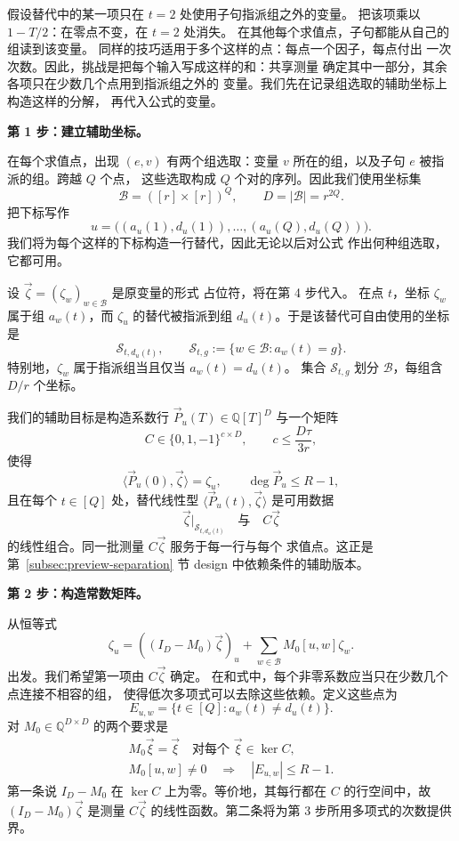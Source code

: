 \documentclass[11pt,reqno]{amsart}
\numberwithin{equation}{section}
\theoremstyle{definition}\newtheorem{definition}[theorem]{定义}
\theoremstyle{remark}\newtheorem{remark}[theorem]{注}
\renewcommand{\le}{\leqslant}
\begin{document}
假设替代中的某一项只在 $t=2$ 处使用子句指派组之外的变量。
把该项乘以 $1-T/2$：在零点不变，在 $t=2$ 处消失。
在其他每个求值点，子句都能从自己的组读到该变量。
同样的技巧适用于多个这样的点：每点一个因子，每点付出
一次次数。因此，挑战是把每个输入写成这样的和：共享测量
确定其中一部分，其余各项只在少数几个点用到指派组之外的
变量。我们先在记录组选取的辅助坐标上构造这样的分解，
再代入公式的变量。

\medskip\noindent
\textbf{第 1 步：建立辅助坐标。}\par\nobreak
\smallskip\noindent
在每个求值点，出现 $(e,v)$ 有两个组选取：变量 $v$
所在的组，以及子句 $e$ 被指派的组。跨越 $Q$ 个点，
这些选取构成 $Q$ 个对的序列。因此我们使用坐标集
\[
 \mathcal B=([r]\times[r])^Q,\qquad D=|\mathcal B|=r^{2Q}.
\]
把下标写作
\[
 u=\bigl((a_u(1),d_u(1)),\ldots,(a_u(Q),d_u(Q))\bigr).
\]
我们将为每个这样的下标构造一行替代，因此无论以后对公式
作出何种组选取，它都可用。

设 $\vec\zeta=(\zeta_w)_{w\in\mathcal B}$ 是原变量的形式
占位符，将在第 4 步代入。
在点 $t$，坐标 $\zeta_w$ 属于组 $a_w(t)$，而 $\zeta_u$
的替代被指派到组 $d_u(t)$。于是该替代可自由使用的坐标是
\[
 \mathcal S_{t,d_u(t)},\qquad
 \mathcal S_{t,g}:=\{w\in\mathcal B:a_w(t)=g\}.
\]
特别地，$\zeta_w$ 属于指派组当且仅当 $a_w(t)=d_u(t)$。
集合 $\mathcal S_{t,g}$ 划分 $\mathcal B$，每组含 $D/r$
个坐标。

我们的辅助目标是构造系数行 $\vec P_u(T)\in\mathbb Q[T]^D$
与一个矩阵
\[
 C\in\{0,1,-1\}^{c\times D},\qquad c\le\frac{D\tau}{3r},
\]
使得
\[
 \langle\vec P_u(0),\vec\zeta\rangle=\zeta_u,
 \qquad \deg\vec P_u\le R-1,
\]
且在每个 $t\in[Q]$ 处，替代线性型
$\langle\vec P_u(t),\vec\zeta\rangle$ 是可用数据
\begin{equation}\label{eq:overview-auxiliary-requirement}
 \vec\zeta|_{\mathcal S_{t,d_u(t)}}\quad\text{与}\quad C\vec\zeta
\end{equation}
的线性组合。同一批测量 $C\vec\zeta$ 服务于每一行与每个
求值点。这正是第~\ref{subsec:preview-separation} 节 design
中依赖条件的辅助版本。

\medskip\noindent
\textbf{第 2 步：构造常数矩阵。}\par\nobreak
\smallskip\noindent
从恒等式
\[
 \zeta_u=((I_D-M_0)\vec\zeta)_u+
                   \sum_{w\in\mathcal B}M_0[u,w]\zeta_w.
\]
出发。我们希望第一项由 $C\vec\zeta$ 确定。
在和式中，每个非零系数应当只在少数几个点连接不相容的组，
使得低次多项式可以去除这些依赖。定义这些点为
\[
 E_{u,w}=\{t\in[Q]:a_w(t)\ne d_u(t)\}.
\]
对 $M_0\in\mathbb Q^{D\times D}$ 的两个要求是
\begin{equation}\label{eq:outline-matrix-conditions}
 \begin{gathered}
 M_0\vec\xi=\vec\xi\quad\text{对每个 }\vec\xi\in\ker C,\\
 M_0[u,w]\ne0\quad\Longrightarrow\quad |E_{u,w}|\le R-1.
 \end{gathered}
\end{equation}
第一条说 $I_D-M_0$ 在 $\ker C$ 上为零。等价地，其每行都在
$C$ 的行空间中，故 $(I_D-M_0)\vec\zeta$ 是测量 $C\vec\zeta$
的线性函数。第二条将为第 3 步所用多项式的次数提供界。
\end{document}
